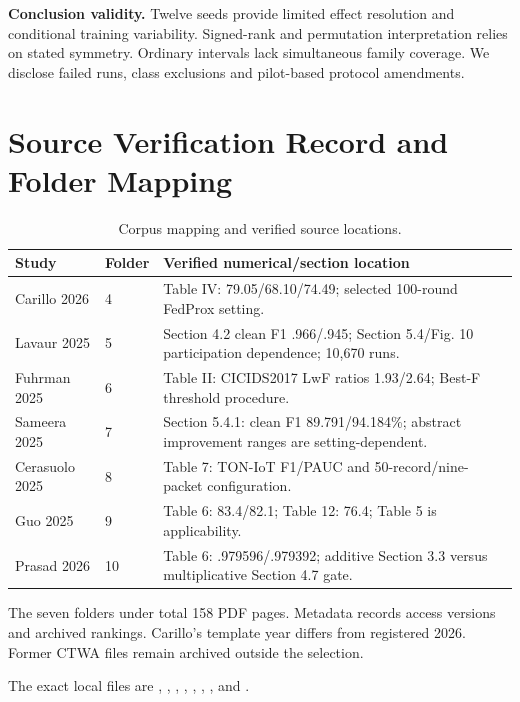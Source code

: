 \documentclass[10pt,a4paper]{article}
\begin{document}
\textbf{Conclusion validity.} Twelve seeds provide limited effect resolution and conditional training variability. Signed-rank and permutation interpretation relies on stated symmetry. Ordinary intervals lack simultaneous family coverage. We disclose failed runs, class exclusions and pilot-based protocol amendments.

\appendix
\section{Source Verification Record and Folder Mapping}
\label{app:sources}
\begin{table}[htbp]
\centering\footnotesize
\caption{Corpus mapping and verified source locations.}
\label{tab:mapping}
\begin{tabularx}{\linewidth}{L{2.4cm}L{1.0cm}Y}
\toprule
Study & Folder & Verified numerical/section location\\
\midrule
Carillo 2026 & 4 & Table IV: 79.05/68.10/74.49; selected 100-round FedProx setting.\\
Lavaur 2025 & 5 & Section 4.2 clean F1 .966/.945; Section 5.4/Fig. 10 participation dependence; 10,670 runs.\\
Fuhrman 2025 & 6 & Table II: CICIDS2017 LwF ratios 1.93/2.64; Best-F threshold procedure.\\
Sameera 2025 & 7 & Section 5.4.1: clean F1 89.791/94.184\%; abstract improvement ranges are setting-dependent.\\
Cerasuolo 2025 & 8 & Table 7: TON-IoT F1/PAUC and 50-record/nine-packet configuration.\\
Guo 2025 & 9 & Table 6: 83.4/82.1; Table 12: 76.4; Table 5 is applicability.\\
Prasad 2026 & 10 & Table 6: .979596/.979392; additive Section 3.3 versus multiplicative Section 4.7 gate.\\
\bottomrule
\end{tabularx}
\end{table}
The seven folders under  total 158 PDF pages. Metadata records access versions and archived rankings. Carillo's template year differs from registered 2026. Former CTWA files remain archived outside the selection.

The exact local files are , , , , , , , and .
\end{document}
